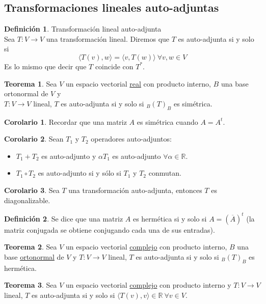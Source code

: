 \documentclass[10pt]{article}
\theoremstyle{definition}
\newtheorem{definition}{Definición}[section]
\newtheorem{theorem}{Teorema}[section]
\newtheorem{corollary}{Corolario}[theorem]
\begin{document}
\subsection{Transformaciones lineales auto-adjuntas}
\begin{definition}{Transformación lineal auto-adjunta}
	\\Sea $T:V\to V$ una transformación lineal. Diremos que $T$ es auto-adjunta si y solo si $$\langle T(v),w\rangle=\langle v,T(w)\rangle\ \forall v,w\in V$$
	Es lo mismo que decir que $T$ coincide con $T^*$.
\end{definition}
\begin{theorem}
	Sea $V$ un espacio vectorial \underline{real} con producto interno, $B$ una base ortonormal de $V$ y\\ $T:V\to V$ lineal, $T$ es auto-adjunta si y solo si $_B(T)_B$ es simétrica.
\end{theorem}
\begin{corollary}
	Recordar que una matriz $A$ es simétrica cuando $A=A^t$.
\end{corollary}
\begin{corollary}
    Sean $T_1$ y $T_2$ operadores auto-adjuntos:
    \begin{itemize}
        \item $T_1+T_2$ es auto-adjunto y $\alpha T_1$ es auto-adjunto $\forall\alpha\in\mathbb{R}$.
        \item $T_1\circ T_2$ es auto-adjunto si y sólo si $T_1$ y $T_2$ conmutan.
    \end{itemize}
\end{corollary}
\begin{corollary}
    Sea $T$ una transformación auto-adjunta, entonces $T$ es diagonalizable.
\end{corollary}
\begin{definition}
	Se dice que una matriz $A$ es hermética si y solo si $A=(\overline{A})^t$ (la matriz conjugada se obtiene conjugando cada una de sus entradas).
\end{definition}
\begin{theorem}
	Sea $V$ un espacio vectorial \underline{complejo} con producto interno, $B$ una base \underline{ortonormal} de $V$ y $T:V\to V$ lineal, $T$ es auto-adjunta si y solo si $_B(T)_B$ es hermética.
\end{theorem}
\begin{theorem}
	Sea $V$ un espacio vectorial \underline{complejo} con producto interno y $T:V\to V$ lineal, $T$ es auto-adjunta si y solo si $\langle T(v),v\rangle\in\mathbb{R}\ \forall v\in V$.
\end{theorem}
\end{document}

